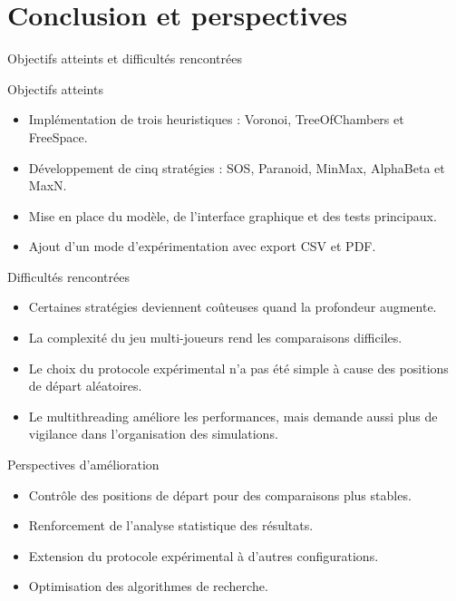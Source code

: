 \documentclass[10pt]{beamer}
\begin{document}
\section{Conclusion et perspectives}
\begin{frame}{Objectifs atteints et difficultés rencontrées}
    \begin{block}{Objectifs atteints}
        \begin{itemize}
            \item Implémentation de trois heuristiques : Voronoi, TreeOfChambers et FreeSpace.
            \item Développement de cinq stratégies : SOS, Paranoid, MinMax, AlphaBeta et MaxN.
            \item Mise en place du modèle, de l'interface graphique et des tests principaux.
            \item Ajout d'un mode d'expérimentation avec export CSV et PDF.
        \end{itemize}
    \end{block}

    \begin{alertblock}{Difficultés rencontrées}
        \begin{itemize}
            \item Certaines stratégies deviennent coûteuses quand la profondeur augmente.
            \item La complexité du jeu multi-joueurs rend les comparaisons difficiles.
            \item Le choix du protocole expérimental n'a pas été simple à cause des positions de départ aléatoires.
            \item Le multithreading améliore les performances, mais demande aussi plus de vigilance dans l'organisation des simulations.
        \end{itemize}
    \end{alertblock}
\end{frame}

\begin{frame}{Perspectives d'amélioration}
    \begin{tcolorbox}[enhanced, arc=5pt, colback=softgreen, colframe=donecolor, title=Piste possible et validation future]
        \begin{itemize}
            \item Contrôle des positions de départ pour des comparaisons plus stables.
            \item Renforcement de l'analyse statistique des résultats.
            \item Extension du protocole expérimental à d'autres configurations.
            \item Optimisation des algorithmes de recherche.
        \end{itemize}
    \end{tcolorbox}
\end{frame}
\end{document}
